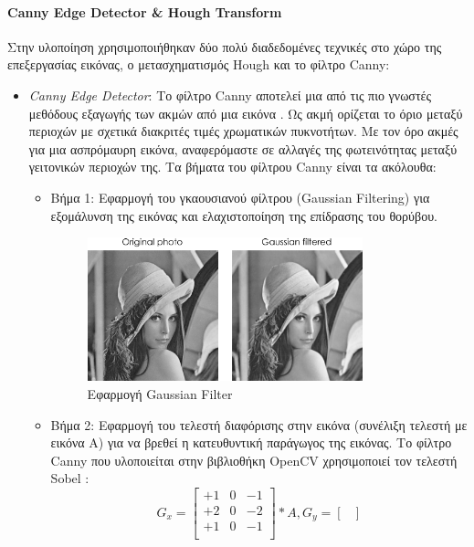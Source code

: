 \paragraph{Canny Edge Detector \& Hough Transform}
Στην υλοποίηση χρησιμοποιήθηκαν δύο πολύ διαδεδομένες τεχνικές στο χώρο της επεξεργασίας εικόνας, ο μετασχηματισμός Hough και το φίλτρο Canny:
\begin{itemize}
    \item \emph{Canny Edge Detector}: Το φίλτρο Canny αποτελεί μια από τις πιο γνωστές μεθόδους εξαγωγής των ακμών από μια εικόνα \cite{wiki:canny}. Ως ακμή ορίζεται το όριο μεταξύ περιοχών με σχετικά διακριτές τιμές χρωματικών πυκνοτήτων. Με τον όρο ακμές για μια ασπρόμαυρη εικόνα, αναφερόμαστε σε αλλαγές της φωτεινότητας μεταξύ γειτονικών περιοχών της. Τα βήματα του φίλτρου Canny είναι τα ακόλουθα:
    \begin{itemize}
        \item Βήμα 1: Εφαρμογή του γκαουσιανού φίλτρου (Gaussian Filtering) για εξομάλυνση της εικόνας και ελαχιστοποίηση της επίδρασης του θορύβου.
        \begin{figure}[H]
            \centering
            \includegraphics[width=0.8\textwidth]{images/gaussian_filtr.png}
            \caption{Εφαρμογή Gaussian Filter}
            \label{fig:gaussian}
        \end{figure}
        \item Βήμα 2: Εφαρμογή του τελεστή διαφόρισης στην εικόνα (συνέλιξη τελεστή με εικόνα Α) για να βρεθεί η κατευθυντική παράγωγος της εικόνας. Το φίλτρο Canny που υλοποιείται στην βιβλιοθήκη OpenCV χρησιμοποιεί τον τελεστή Sobel \cite{wiki:sobel}:
        \[ G_x = \begin{bmatrix}
            +1 & 0 & -1\\
            +2 & 0 & -2\\
            +1 & 0 & -1\\
        \end{bmatrix} * A, G_y = \begin{bmatrix}

\end{bmatrix}\]
\end{itemize}
\end{itemize}
